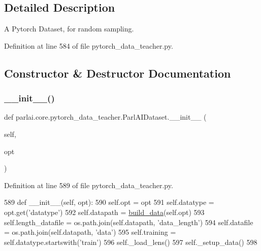 \subsection{Detailed Description}
\begin{DoxyVerb}A Pytorch Dataset, for random sampling.
\end{DoxyVerb}
 

Definition at line 584 of file pytorch\+\_\+data\+\_\+teacher.\+py.



\subsection{Constructor \& Destructor Documentation}
\mbox{\label{classparlai_1_1core_1_1pytorch__data__teacher_1_1ParlAIDataset_ac37c4338b73b65fd101bc926e8692366}} 
\subsubsection{\texorpdfstring{\+\_\+\+\_\+init\+\_\+\+\_\+()}{\_\_init\_\_()}}
{\footnotesize\ttfamily def parlai.\+core.\+pytorch\+\_\+data\+\_\+teacher.\+Parl\+A\+I\+Dataset.\+\_\+\+\_\+init\+\_\+\+\_\+ (\begin{DoxyParamCaption}\item[{}]{self,  }\item[{}]{opt }\end{DoxyParamCaption})}



Definition at line 589 of file pytorch\+\_\+data\+\_\+teacher.\+py.


\begin{DoxyCode}
589     \textcolor{keyword}{def }\_\_init\_\_(self, opt):
590         self.opt = opt
591         self.datatype = opt.get(\textcolor{stringliteral}{'datatype'})
592         self.datapath = \hyperlink{namespaceparlai_1_1scripts_1_1build__pytorch__data_a50d93b1dec37499085b9eafc6e425a1a}{build\_data}(self.opt)
593         self.length\_datafile = os.path.join(self.datapath, \textcolor{stringliteral}{'data\_length'})
594         self.datafile = os.path.join(self.datapath, \textcolor{stringliteral}{'data'})
595         self.training = self.datatype.startswith(\textcolor{stringliteral}{'train'})
596         self.\_load\_lens()
597         self.\_setup\_data()
598 
\end{DoxyCode}



